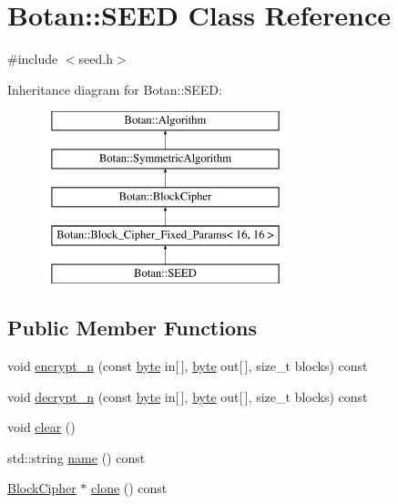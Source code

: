 \hypertarget{classBotan_1_1SEED}{\section{Botan\-:\-:S\-E\-E\-D Class Reference}
\label{classBotan_1_1SEED}
}


{\ttfamily \#include $<$seed.\-h$>$}

Inheritance diagram for Botan\-:\-:S\-E\-E\-D\-:\begin{figure}[H]
\begin{center}
\leavevmode
\includegraphics[height=5.000000cm]{classBotan_1_1SEED}
\end{center}
\end{figure}
\subsection*{Public Member Functions}
\begin{DoxyCompactItemize}
\item 
void \hyperlink{classBotan_1_1SEED_a5d06ee3b1f91256eb886c7c776e40c70}{encrypt\-\_\-n} (const \hyperlink{namespaceBotan_a7d793989d801281df48c6b19616b8b84}{byte} in\mbox{[}$\,$\mbox{]}, \hyperlink{namespaceBotan_a7d793989d801281df48c6b19616b8b84}{byte} out\mbox{[}$\,$\mbox{]}, size\-\_\-t blocks) const 
\item 
void \hyperlink{classBotan_1_1SEED_a28270538dc9c6f0dcde93f347ea3bbe6}{decrypt\-\_\-n} (const \hyperlink{namespaceBotan_a7d793989d801281df48c6b19616b8b84}{byte} in\mbox{[}$\,$\mbox{]}, \hyperlink{namespaceBotan_a7d793989d801281df48c6b19616b8b84}{byte} out\mbox{[}$\,$\mbox{]}, size\-\_\-t blocks) const 
\item 
void \hyperlink{classBotan_1_1SEED_ad6298a2d28a8f96bef2d02ac75f63bf4}{clear} ()
\item 
std\-::string \hyperlink{classBotan_1_1SEED_a8ccbab381d47636b61b417359833fc76}{name} () const 
\item 
\hyperlink{classBotan_1_1BlockCipher}{Block\-Cipher} $\ast$ \hyperlink{classBotan_1_1SEED_ab577eeecd42efd412504513a25aca511}{clone} () const 
\end{DoxyCompactItemize}
